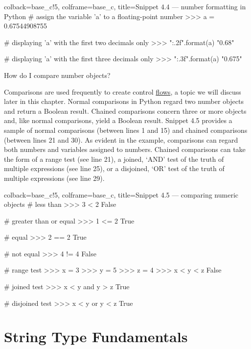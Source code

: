 \documentclass[a4paper,11pt]{book}
\numberwithin{figure}{chapter}
\numberwithin{table}{chapter}
\newcommand{\question}[1]{%
    \begin{tcolorbox}[colback=comp_c!10,colframe=comp_c,sidebyside align=top,width=\linewidth,before skip=1ex]
        #1
    \end{tcolorbox}
    \switchcolumn%
}
\newcommand{\note}[1]{%
    \begin{tcolorbox}[colback=white!0,colframe=white!10,width=\linewidth,before skip=1ex]
        #1
    \end{tcolorbox}
}
\begin{document}
\begin{pythoncode}[linenos=true,]{colback=base_c!5, colframe=base_c, title=\sffamily Snippet 4.4 --- number formatting in Python}
# assign the variable 'a' to a floating-point number
>>> a = 0.67544908755

# displaying 'a' with the first two decimals only
>>> "{:.2f}".format(a)
"0.68"

# displaying 'a' with the first three decimals only
>>> "{:.3f}".format(a)
"0.675"
\end{pythoncode}

\begin{paracol}{2}
	\question{\raggedright{How do I compare number objects?}}
	\note{Comparisons are used frequently to create control \href{https://docs.python.org/3/tutorial/controlflow.html}{flows}, a topic we will discuss later in this chapter. Normal comparisons in Python regard two number objects and return a Boolean result. Chained comparisons concern three or more objects and, like normal comparisons, yield a Boolean result. Snippet 4.5 provides a sample of normal comparisons (between lines 1 and 15) and chained comparisons (between lines 21 and 30). As evident in the example, comparisons can regard both numbers and variables assigned to numbers. Chained comparisons can take the form of a range test (see line 21), a joined, `AND' test of the truth of multiple expressions (see line 25), or a disjoined, `OR' test of the truth of multiple expressions (see line 29).}
\end{paracol}
\clearpage

\begin{pythoncode}[linenos=true,]{colback=base_c!5, colframe=base_c, title=\sffamily Snippet 4.5 --- comparing numeric objects}
# less than
>>> 3 < 2
False

# greater than or equal
>>> 1 <= 2
True

# equal
>>> 2 == 2
True 

# not equal
>>> 4 != 4
False

# range test
>>> x = 3
>>> y = 5
>>> z = 4
>>> x < y < z
False

# joined test
>>> x < y and y > z
True

# disjoined test
>>> x < y or y < z
True 

\end{pythoncode}

\section{String Type Fundamentals}
\end{document}
